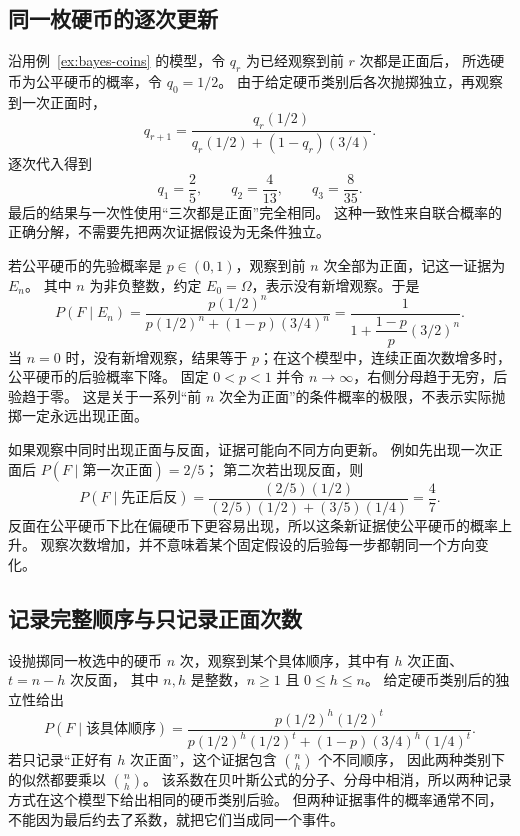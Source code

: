 \documentclass[UTF8]{ctexart}
\begin{document}
\subsection{同一枚硬币的逐次更新}

沿用例~\ref{ex:bayes-coins} 的模型，令 $q_r$ 为已经观察到前 $r$ 次都是正面后，
所选硬币为公平硬币的概率，令 $q_0=1/2$。
由于给定硬币类别后各次抛掷独立，再观察到一次正面时，
\begin{equation}
  q_{r+1}=\frac{q_r(1/2)}{q_r(1/2)+(1-q_r)(3/4)}.
  \label{eq:bayes-coin-recursion}
\end{equation}
逐次代入得到
\[
  q_1=\frac25,\qquad q_2=\frac4{13},\qquad q_3=\frac8{35}.
\]
最后的结果与一次性使用“三次都是正面”完全相同。
这种一致性来自联合概率的正确分解，不需要先把两次证据假设为无条件独立。

若公平硬币的先验概率是 $p\in(0,1)$，观察到前 $n$ 次全部为正面，记这一证据为 $E_n$。
其中 $n$ 为非负整数，约定 $E_0=\Omega$，表示没有新增观察。于是
\begin{equation}
  P(F\mid E_n)
  =\frac{p(1/2)^n}{p(1/2)^n+(1-p)(3/4)^n}
  =\frac{1}{1+\dfrac{1-p}{p}(3/2)^n}.
  \label{eq:bayes-coin-heads}
\end{equation}
当 $n=0$ 时，没有新增观察，结果等于 $p$；在这个模型中，连续正面次数增多时，公平硬币的后验概率下降。
固定 $0<p<1$ 并令 $n\to\infty$，右侧分母趋于无穷，后验趋于零。
这是关于一系列“前 $n$ 次全为正面”的条件概率的极限，不表示实际抛掷一定永远出现正面。

如果观察中同时出现正面与反面，证据可能向不同方向更新。
例如先出现一次正面后 $P(F\mid\text{第一次正面})=2/5$；
第二次若出现反面，则
\[
  P(F\mid\text{先正后反})
  =\frac{(2/5)(1/2)}{(2/5)(1/2)+(3/5)(1/4)}=\frac47.
\]
反面在公平硬币下比在偏硬币下更容易出现，所以这条新证据使公平硬币的概率上升。
观察次数增加，并不意味着某个固定假设的后验每一步都朝同一个方向变化。

\subsection{记录完整顺序与只记录正面次数}

设抛掷同一枚选中的硬币 $n$ 次，观察到某个具体顺序，其中有 $h$ 次正面、$t=n-h$ 次反面，
其中 $n,h$ 是整数，$n\geq1$ 且 $0\leq h\leq n$。
给定硬币类别后的独立性给出
\begin{equation}
  P(F\mid\text{该具体顺序})
  =\frac{p(1/2)^h(1/2)^t}
  {p(1/2)^h(1/2)^t+(1-p)(3/4)^h(1/4)^t}.
  \label{eq:bayes-coin-sequence}
\end{equation}
若只记录“正好有 $h$ 次正面”，这个证据包含 $\binom nh$ 个不同顺序，
因此两种类别下的似然都要乘以 $\binom nh$。
该系数在贝叶斯公式的分子、分母中相消，所以两种记录方式在这个模型下给出相同的硬币类别后验。
但两种证据事件的概率通常不同，不能因为最后约去了系数，就把它们当成同一个事件。
\end{document}
